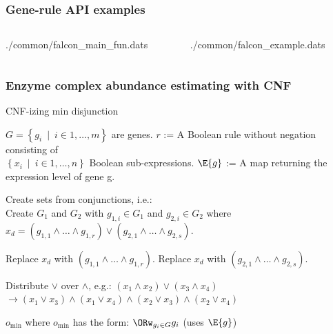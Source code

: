 \documentclass[compress]{beamer}
\newcommand*{\commonDir}{./common/}%
\begin{document}
\begin{frame}[fragile]
\frametitle{Gene-rule API examples}

\begin{columns}
%
\begin{column}{0.5\textwidth}

{\commonDir falcon_main_fun.dats}
\end{column}
%
\vrule{}
%
\begin{column}{0.5\textwidth}

{\commonDir falcon_example.dats}
\end{column}
%
\end{columns}
\end{frame}


\begin{frame}[fragile]
\frametitle{Enzyme complex abundance estimating with CNF}

\begin{algorithm}[H]
\scriptsize
\caption{CNF-izing min disjunction}
\label{alg:ReductionToCNF}
\begin{algorithmic}
\INPUT $G = \left\{g_i~\mid~i \in{1, \ldots, m}\right\}$ are genes. 
\INPUT $r$ := A Boolean rule without negation consisting of\\
  $\left\{x_i~\mid~i \in{1, \ldots, n}\right\}$ Boolean sub-expressions.
\INPUT $\E{g}$ := A map returning the expression level of gene g.
  \State \parbox[t]{\dimexpr\linewidth-\algorithmicindent}{
    Create sets from conjunctions, i.e.:\\
    Create $G_1$ and $G_2$ with $g_{1,i} \in G_1$ 
    and $g_{2,i} \in G_2$ where\\ 
    $x_d = (g_{1,1} \land \ldots \land g_{1,r}) \lor 
    (g_{2,1} \land \ldots \land g_{2,s})$. 
    \strut}
    \State Replace $x_d$ with $(g_{1,1} \land \ldots \land g_{1,r})$.
    \State Replace $x_d$ with $(g_{2,1} \land \ldots \land g_{2,s})$.
    \EndIf 
  \EndIf
  \State \parbox[t]{\dimexpr\linewidth-\algorithmicindent}{
    Distribute $\lor$ over $\land$, e.g.: $(x_1 \land x_2) \lor (x_3 \land x_4)$ \\ 
    $\rightarrow (x_1 \lor x_3) \land (x_1 \lor x_4) \land 
    (x_2 \lor x_3) \land (x_2 \lor x_4)$
    \strut}
\EndWhile
\OUTPUT $o_{\min}$ where $o_{\min}$ has the form: $\ORw_{g_i \in G} g_i$ (uses $\E{g}$)
\end{algorithmic} 
\end{algorithm}

\end{frame}
\end{document}
